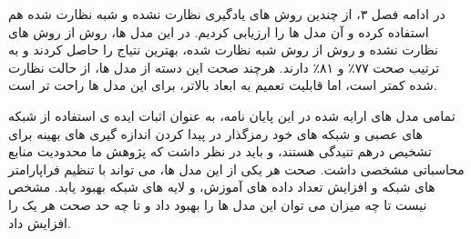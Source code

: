 در ادامه فصل ۳، از چندین روش های یادگیری نظارت نشده و شبه نظارت شده هم استفاده کرده و آن مدل ها را ارزیابی کردیم. در این مدل ها، روش
از روش های نظارت نشده و روش
از روش شبه نظارت شده، بهترین نتیاج را حاصل کردند و به ترتیب صحت
۷۷٪
و
۸۱٪
دارند.
هرچند صحت این دسته از مدل ها، از حالت نظارت شده کمتر است، اما قابلیت تعمیم به ابعاد بالاتر، برای این مدل ها راحت تر است.

تمامی مدل های ارایه شده در این پایان نامه، به عنوان اثبات ایده ی استفاده از شبکه های عصبی و شبکه های خود رمزگذار در پیدا کردن اندازه گیری های بهینه برای تشخیص درهم تنیدگی هستند، و باید در نظر داشت که پژوهش ما محدودیت منابع محاسباتی مشخصی داشت. صحت هر یکی از این مدل ها، می تواند با تنظیم فراپارامتر های شبکه و افزایش تعداد داده های آموزش، و لایه های شبکه بهبود یابد. مشخص نیست تا چه میزان می توان این مدل ها را بهبود داد و تا چه حد صحت هر یک را افزایش داد.
